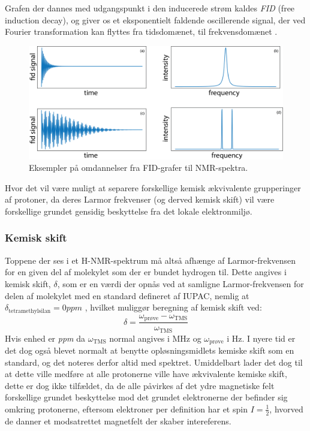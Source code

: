    Grafen der dannes med udgangspunkt i den inducerede strøm kaldes \textit{FID}  (free induction decay), og giver os et eksponentielt faldende oscillerende signal, der ved Fourier transformation kan flyttes fra tidsdomænet, til frekvensdomænet \parencite{Davi2022}.
    \begin{figure}[H]\centering
        \includegraphics[width=\textwidth]{billeder/fourier}
        \caption{Eksempler på omdannelser fra FID-grafer til NMR-spektra.}
    \end{figure}
    Hvor det vil være muligt at separere forskellige kemisk ækvivalente grupperinger af protoner, da deres Larmor frekvenser (og derved kemisk skift) vil være forskellige grundet gensidig beskyttelse fra det lokale elektronmiljø.

    \subsubsection{Kemisk skift}
    Toppene der ses i et H-NMR-spektrum må altså afhænge af Larmor-frekvensen for en given del af molekylet som der er bundet hydrogen til. Dette angives i kemisk skift, $\delta$, som er en værdi der opnås ved at samligne Larmor-frekvensen for delen af molekylet med en standard defineret af IUPAC, nemlig at $\delta_{\text{tetramethylsilan}}=0\si{ppm}$ \parencite{Robi2009}, hvilket muliggør beregning af kemisk skift ved:
    \[
        \delta = \frac{\omega_{\text{prøve}}-\omega_{\text{TMS}}}{\omega_{\text{TMS}}}
    \]
    Hvis enhed er \textit{ppm} da $\omega_{\text{TMS}}$ normal angives i MHz og  $\omega_{\text{prøve}}$ i Hz. I nyere tid er det dog også blevet normalt at benytte opløsningsmidlets kemiske skift som en standard, og det noteres derfor altid med spektret. Umiddelbart lader det dog til at dette ville medføre at alle protonerne ville have ækvivalente kemiske skift, dette er dog ikke tilfældet, da de alle påvirkes af det ydre magnetiske felt forskellige grundet beskyttelse mod det grundet elektronerne der befinder sig omkring protonerne, eftersom elektroner per definition har et spin $I=\frac{1}{2}$, hvorved de danner et modsatrettet magnetfelt der skaber intereferens.

